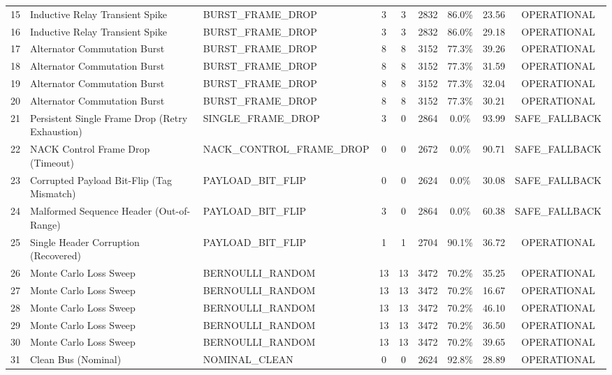 \begin{table}[t]
\begin{tabular}{cllcccccc}
15 & Inductive Relay Transient Spike & BURST\_FRAME\_DROP & 3 & 3 & 2832 & 86.0\% & 23.56 & OPERATIONAL \\
16 & Inductive Relay Transient Spike & BURST\_FRAME\_DROP & 3 & 3 & 2832 & 86.0\% & 29.18 & OPERATIONAL \\
\midrule
17 & Alternator Commutation Burst & BURST\_FRAME\_DROP & 8 & 8 & 3152 & 77.3\% & 39.26 & OPERATIONAL \\
18 & Alternator Commutation Burst & BURST\_FRAME\_DROP & 8 & 8 & 3152 & 77.3\% & 31.59 & OPERATIONAL \\
19 & Alternator Commutation Burst & BURST\_FRAME\_DROP & 8 & 8 & 3152 & 77.3\% & 32.04 & OPERATIONAL \\
20 & Alternator Commutation Burst & BURST\_FRAME\_DROP & 8 & 8 & 3152 & 77.3\% & 30.21 & OPERATIONAL \\
\midrule
21 & Persistent Single Frame Drop (Retry Exhaustion) & SINGLE\_FRAME\_DROP & 3 & 0 & 2864 & 0.0\% & 93.99 & SAFE\_FALLBACK \\
22 & NACK Control Frame Drop (Timeout) & NACK\_CONTROL\_FRAME\_DROP & 0 & 0 & 2672 & 0.0\% & 90.71 & SAFE\_FALLBACK \\
23 & Corrupted Payload Bit-Flip (Tag Mismatch) & PAYLOAD\_BIT\_FLIP & 0 & 0 & 2624 & 0.0\% & 30.08 & SAFE\_FALLBACK \\
24 & Malformed Sequence Header (Out-of-Range) & PAYLOAD\_BIT\_FLIP & 3 & 0 & 2864 & 0.0\% & 60.38 & SAFE\_FALLBACK \\
25 & Single Header Corruption (Recovered) & PAYLOAD\_BIT\_FLIP & 1 & 1 & 2704 & 90.1\% & 36.72 & OPERATIONAL \\
\midrule
26 & Monte Carlo Loss Sweep & BERNOULLI\_RANDOM & 13 & 13 & 3472 & 70.2\% & 35.25 & OPERATIONAL \\
27 & Monte Carlo Loss Sweep & BERNOULLI\_RANDOM & 13 & 13 & 3472 & 70.2\% & 16.67 & OPERATIONAL \\
28 & Monte Carlo Loss Sweep & BERNOULLI\_RANDOM & 13 & 13 & 3472 & 70.2\% & 46.10 & OPERATIONAL \\
29 & Monte Carlo Loss Sweep & BERNOULLI\_RANDOM & 13 & 13 & 3472 & 70.2\% & 36.50 & OPERATIONAL \\
30 & Monte Carlo Loss Sweep & BERNOULLI\_RANDOM & 13 & 13 & 3472 & 70.2\% & 39.65 & OPERATIONAL \\
\midrule
31 & Clean Bus (Nominal) & NOMINAL\_CLEAN & 0 & 0 & 2624 & 92.8\% & 28.89 & OPERATIONAL \\
\bottomrule
\end{tabular}
\end{table}
